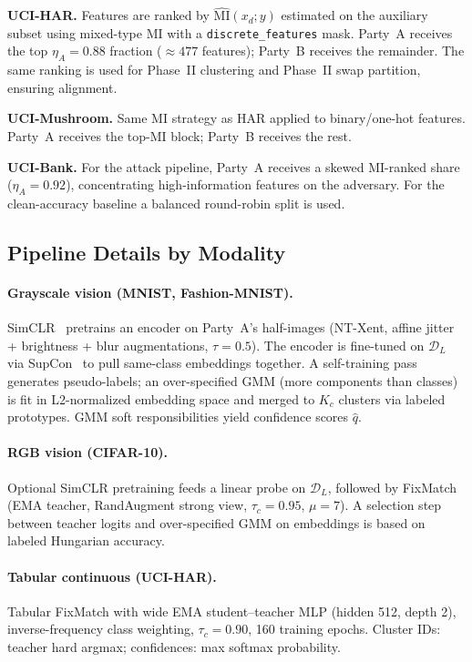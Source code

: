 \documentclass{article}
\begin{document}
\textbf{UCI-HAR.}
Features are ranked by $\widehat{\mathrm{MI}}(x_d;y)$ estimated on the
auxiliary subset using mixed-type MI with a \texttt{discrete\_features} mask.
Party~A receives the top $\eta_A\!=\!0.88$ fraction (${\approx}477$ features);
Party~B receives the remainder.
The same ranking is used for Phase~II clustering and Phase~II swap partition,
ensuring alignment.

\textbf{UCI-Mushroom.}
Same MI strategy as HAR applied to binary/one-hot features.
Party~A receives the top-MI block; Party~B receives the rest.

\textbf{UCI-Bank.}
For the attack pipeline, Party~A receives a skewed MI-ranked share
($\eta_A\!=\!0.92$), concentrating high-information features on the adversary.
For the clean-accuracy baseline a balanced round-robin split is used.

\subsection{Pipeline Details by Modality}

\paragraph{Grayscale vision (MNIST, Fashion-MNIST).}
SimCLR~\citep{chen2020simple} pretrains an encoder on Party~A's half-images
(NT-Xent, affine jitter + brightness + blur augmentations, $\tau\!=\!0.5$).
The encoder is fine-tuned on $\mathcal{D}_L$ via SupCon~\citep{khosla2020supervised}
to pull same-class embeddings together.
A self-training pass generates pseudo-labels; an over-specified GMM
(more components than classes) is fit in L2-normalized embedding space and
merged to $K_c$ clusters via labeled prototypes.
GMM soft responsibilities yield confidence scores $\hat{q}$.

\paragraph{RGB vision (CIFAR-10).}
Optional SimCLR pretraining feeds a linear probe on $\mathcal{D}_L$,
followed by FixMatch~\citep{sohn2020fixmatch} (EMA teacher,
RandAugment strong view, $\tau_c\!=\!0.95$, $\mu\!=\!7$).
A selection step between teacher logits and over-specified GMM on embeddings
is based on labeled Hungarian accuracy.

\paragraph{Tabular continuous (UCI-HAR).}
Tabular FixMatch with wide EMA student--teacher MLP (hidden 512, depth 2),
inverse-frequency class weighting, $\tau_c\!=\!0.90$, 160 training epochs.
Cluster IDs: teacher hard argmax; confidences: max softmax probability.
\end{document}
